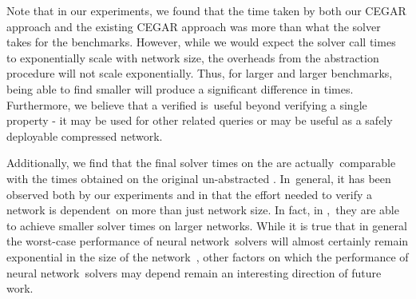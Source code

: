 Note that in our experiments, we found that the time taken by both our CEGAR approach and the existing CEGAR approach \cite{cegar-nn} was more than what the \neuralsat solver takes for the \acasxu benchmarks. However, while we would expect the solver call times to exponentially scale with network size, the overheads from the abstraction procedure will not scale exponentially. Thus, for larger and larger benchmarks, being able to find smaller \abs will produce a significant difference in times. Furthermore, we believe that a verified \abs is useful beyond verifying a single property - it may be used for other related queries or may be useful as a safely deployable compressed network.


Additionally, we find that the final solver times on the \abs are actually comparable with the times obtained on the original un-abstracted \cnc. In general, it has been observed both by our experiments and in \cite{cegar-nn} that the effort needed to verify a network is dependent on more than just network size. In fact, in \cite{cegar-nn}, they are able to achieve smaller solver times on larger networks.
While it is true that in general the worst-case performance of neural network solvers will almost certainly remain exponential in the size of the network \cite{reluplex}, other factors on which the performance of neural network solvers may depend remain an interesting direction of future work.


